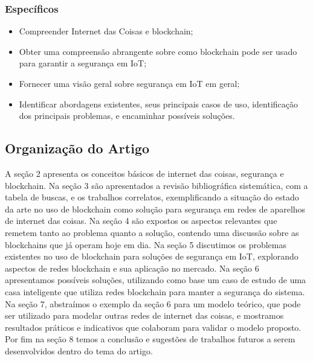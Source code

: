 \subsubsection{Específicos}
\begin{itemize}
\item Compreender Internet das Coisas e blockchain;
\item Obter uma compreensão abrangente sobre como blockchain pode ser usado para garantir a segurança em IoT;
\item Fornecer uma visão geral sobre segurança em IoT em geral;
\item Identificar abordagens existentes, seus principais casos de uso, identificação dos principais problemas, e encaminhar possíveis soluções.
\end{itemize}

\subsection{Organização do Artigo}
	A seção 2 apresenta os conceitos básicos de internet das coisas, segurança e blockchain. Na seção 3 são apresentados a revisão bibliográfica sistemática, com a tabela de buscas, e os trabalhos correlatos, exemplificando a situação do estado da arte no uso de blockchain como solução para segurança em redes de aparelhos de internet das coisas. Na seção 4 são expostos os aspectos relevantes que remetem tanto ao problema quanto a solução, contendo uma discussão sobre as blockchains que já operam hoje em dia. Na seção 5 discutimos os problemas existentes no uso de blockchain para soluções de segurança em IoT, explorando aspectos de redes blockchain e sua aplicação no mercado. Na seção 6 apresentamos possíveis soluções, utilizando como base um caso de estudo de uma casa inteligente que utiliza redes blockchain para manter a segurança do sistema. Na seção 7, abstraímos o exemplo da seção 6 para um modelo teórico, que pode ser utilizado para modelar outras redes de internet das coisas, e mostramos resultados práticos e indicativos que colaboram para validar o modelo proposto. Por fim na seção 8 temos a conclusão e sugestões de trabalhos futuros a serem desenvolvidos dentro do tema do artigo.
	